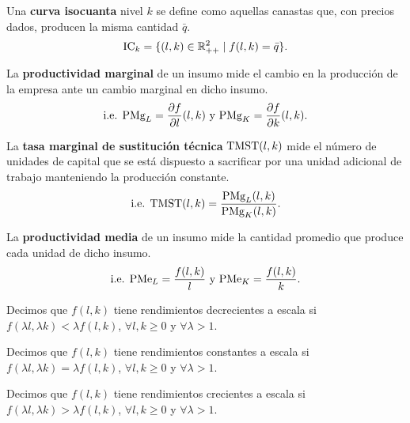 \documentclass[8pt,a4paper]{extarticle}
\begin{document}
\begin{multicols}{3}
\begin{boxdef}[Isocuanta]
Una \textbf{curva isocuanta} nivel $k$ se define como aquellas canastas que, con precios dados, producen la misma cantidad $\bar{q}$. \\
$$\text{\normalfont IC}_k = \{(l, k) \in \mathbb{R}^2_{++} \mid f(l, k) = \bar{q} \}.$$
\end{boxdef}

\begin{boxdef}
	La \textbf{productividad marginal} de un insumo mide el cambio en la producción de la empresa ante un cambio marginal en dicho insumo.
	\[
		\text{\normalfont i.e. PMg}_L = \frac{\partial f}{\partial l} (l, k)\ \text{y } \text{\normalfont PMg}_K = \frac{\partial f}{\partial k} (l, k)
	.\] 
\end{boxdef}

\begin{boxdef}
	La \textbf{tasa marginal de sustitución técnica} $\text{\normalfont TMST} (l, k) $ mide el número de unidades de capital que se está dispuesto a sacrificar por una unidad adicional de trabajo manteniendo la producción constante.
	\[
		\text{\normalfont i.e. TMST}(l,k) = \frac{\text{\normalfont PMg}_L (l, k)}{\text{\normalfont PMg}_K (l, k)}
	.\] 
\end{boxdef}

\begin{boxdef}
	La \textbf{productividad media} de un insumo mide la cantidad promedio que produce cada unidad de dicho insumo.
	\[
		\text{\normalfont i.e. PMe}_L = \frac{f (l, k)}{l}\ \text{y } \text{\normalfont PMe}_K = \frac{f (l, k)}{k}
	.\] 
\end{boxdef}

\sectionbreak

\begin{boxtheo}
	Decimos que $f(l, k)$ tiene rendimientos decrecientes a escala si $f(\lambda l, \lambda k) < \lambda f(l, k)$,\; $\forall l, k \ge 0$ y $\forall \lambda > 1$.
\end{boxtheo}

\begin{boxtheo}
	Decimos que $f(l, k)$ tiene rendimientos constantes a escala si $f(\lambda l, \lambda k) = \lambda f(l, k)$,\; $\forall l, k \ge 0$ y $\forall \lambda > 1$.
\end{boxtheo}

\begin{boxtheo}
	Decimos que $f(l, k)$ tiene rendimientos crecientes a escala si $f(\lambda l, \lambda k) > \lambda f(l, k)$,\; $\forall l, k \ge 0$ y $\forall \lambda > 1$.
\end{boxtheo}


\end{multicols}
\end{document}
